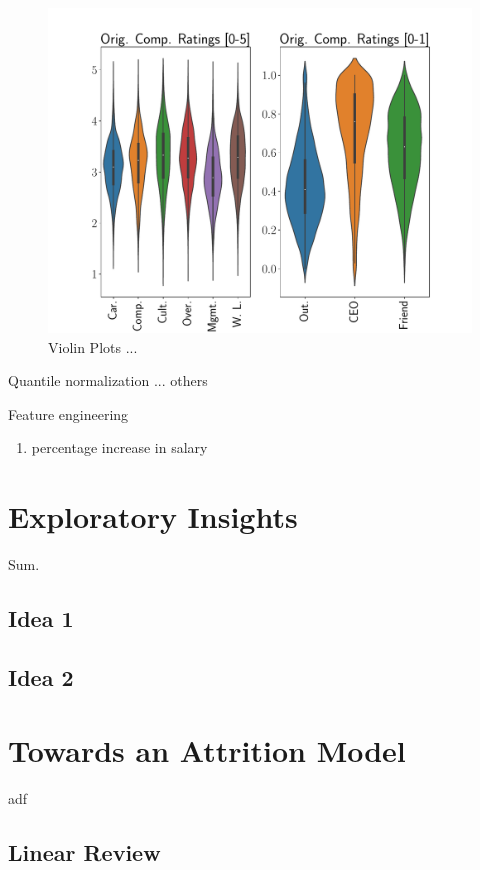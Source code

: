 \documentclass[10pt]{article}
\begin{document}
\begin{figure}[thb]
    \centering
	\includegraphics[width=1.0\linewidth]{vioplt.pdf}
	\caption{Violin Plots ... }
	\label{fig:vioplt}
\end{figure}


Quantile normalization ... others 

Feature engineering 
\begin{enumerate}
    \item percentage increase in salary 
\end{enumerate}

\section{Exploratory Insights}

Sum. 

\subsection{Idea 1}


\subsection{Idea 2}

\section{Towards an Attrition Model}

adf

\subsection{Linear Review}
\end{document}

